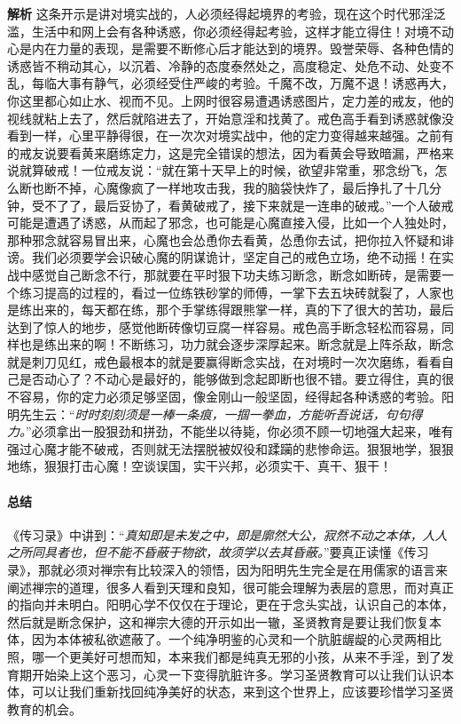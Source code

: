 \textbf{解析} 这条开示是讲对境实战的，人必须经得起境界的考验，现在这个时代邪淫泛滥，生活中和网上会有各种诱惑，你必须经得起考验，这样才能立得住！对境不动心是内在力量的表现，是需要不断修心后才能达到的境界。毁誉荣辱、各种色情的诱惑皆不稍动其心，以沉着、冷静的态度泰然处之，高度稳定、处危不动、处变不乱，每临大事有静气，必须经受住严峻的考验。千魔不改，万魔不退！诱惑再大，你这里都心如止水、视而不见。上网时很容易遭遇诱惑图片，定力差的戒友，他的视线就粘上去了，然后就陷进去了，开始意淫和找黄了。戒色高手看到诱惑就像没看到一样，心里平静得很，在一次次对境实战中，他的定力变得越来越强。之前有的戒友说要看黄来磨练定力，这是完全错误的想法，因为看黄会导致暗漏，严格来说就算破戒！一位戒友说：“就在第十天早上的时候，欲望非常重，邪念纷飞，怎么断也断不掉，心魔像疯了一样地攻击我，我的脑袋快炸了，最后挣扎了十几分钟，受不了了，最后妥协了，看黄破戒了，接下来就是一连串的破戒。”一个人破戒可能是遭遇了诱惑，从而起了邪念，也可能是心魔直接入侵，比如一个人独处时，那种邪念就容易冒出来，心魔也会怂恿你去看黄，怂恿你去试，把你拉入怀疑和诽谤。我们必须要学会识破心魔的阴谋诡计，坚定自己的戒色立场，绝不动摇！在实战中感觉自己断念不行，那就要在平时狠下功夫练习断念，断念如断砖，是需要一个练习提高的过程的，看过一位练铁砂掌的师傅，一掌下去五块砖就裂了，人家也是练出来的，每天都在练，那个手掌练得跟熊掌一样，真的下了很大的苦功，最后达到了惊人的地步，感觉他断砖像切豆腐一样容易。戒色高手断念轻松而容易，同样也是练出来的啊！不断练习，功力就会逐步深厚起来。断念就是上阵杀敌，断念就是刺刀见红，戒色最根本的就是要赢得断念实战，在对境时一次次磨练，看看自己是否动心了？不动心是最好的，能够做到念起即断也很不错。要立得住，真的很不容易，你的定力必须足够坚固，像金刚山一般坚固，经得起各种诱惑的考验。阳明先生云：“\textit{时时刻刻须是一棒一条痕，一掴一拳血，方能听吾说话，句句得力。}”必须拿出一股狠劲和拼劲，不能坐以待毙，你必须不顾一切地强大起来，唯有强过心魔才能不破戒，否则就无法摆脱被奴役和蹂躏的悲惨命运。狠狠地学，狠狠地练，狠狠打击心魔！空谈误国，实干兴邦，必须实干、真干、狠干！

\paragraph*{总结}

《传习录》中讲到：“\textit{真知即是未发之中，即是廓然大公，寂然不动之本体，人人之所同具者也，但不能不昏蔽于物欲，故须学以去其昏蔽。}”要真正读懂《传习录》，那就必须对禅宗有比较深入的领悟，因为阳明先生完全是在用儒家的语言来阐述禅宗的道理，很多人看到天理和良知，很可能会理解为表层的意思，而对真正的指向并未明白。阳明心学不仅仅在于理论，更在于念头实战，认识自己的本体，然后就是断念保护，这和禅宗大德的开示如出一辙，圣贤教育是要让我们恢复本体，因为本体被私欲遮蔽了。一个纯净明鉴的心灵和一个肮脏龌龊的心灵两相比照，哪一个更美好可想而知，本来我们都是纯真无邪的小孩，从来不手淫，到了发育期开始染上这个恶习，心灵一下变得肮脏许多。学习圣贤教育可以让我们认识本体，可以让我们重新找回纯净美好的状态，来到这个世界上，应该要珍惜学习圣贤教育的机会。

